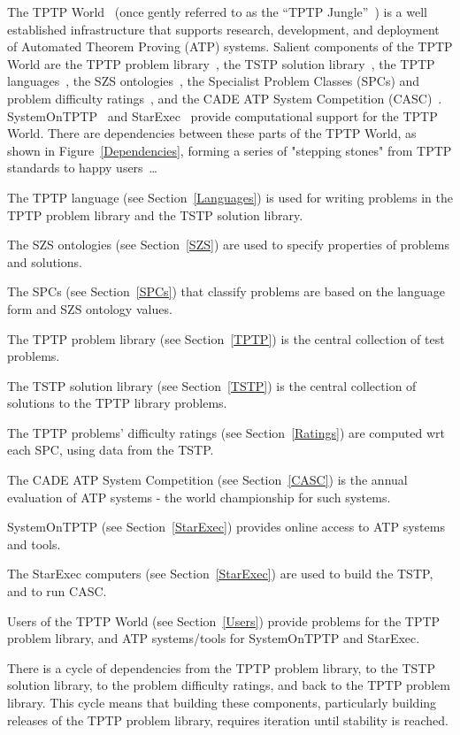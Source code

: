 \documentclass{easychair}
\newenvironment{packed_itemize}{
\vspace*{-0.2em}
\begin{itemize}
\setlength{\partopsep}{0pt}
\setlength{\itemsep}{1pt}
\setlength{\parskip}{0pt}
\setlength{\parsep}{0pt}
}{\end{itemize}}
\begin{document}
The TPTP World~\cite{Sut10,Sut17} (once gently referred to as the ``TPTP Jungle''~\cite{BU13}) is 
a well established infrastructure that supports research, development, and deployment of 
Automated Theorem Proving (ATP) systems.
Salient components of the TPTP World are
the TPTP problem library~\cite{Sut09}, 
the TSTP solution library~\cite{Sut10}, 
the TPTP languages~\cite{SS+06}, 
the SZS ontologies~\cite{Sut08-KEAPPA},
the Specialist Problem Classes (SPCs) and problem difficulty ratings~\cite{SS01},
and the CADE ATP System Competition (CASC)~\cite{Sut16}.
SystemOnTPTP~\cite{Sut00-CADE-17} and StarExec~\cite{SST14} provide computational support for
the TPTP World.
There are dependencies between these parts of the TPTP World, as shown in 
Figure~\ref{Dependencies}, forming a series of "stepping stones" from TPTP standards to 
happy users~\ldots
\begin{packed_itemize}
\item The TPTP language (see Section~\ref{Languages}) is used for writing problems in the TPTP
      problem library and the TSTP solution library.
\item The SZS ontologies (see Section~\ref{SZS}) are used to specify properties of problems
      and solutions.
\item The SPCs (see Section~\ref{SPCs}) that classify problems are based on the language form 
      and SZS ontology values.
\item The TPTP problem library (see Section~\ref{TPTP}) is the central collection of test problems.
\item The TSTP solution library (see Section~\ref{TSTP}) is the central collection of solutions
      to the TPTP library problems.
\item The TPTP problems' difficulty ratings (see Section~\ref{Ratings}) are computed wrt each
      SPC, using data from the TSTP.
\item The CADE ATP System Competition (see Section~\ref{CASC}) is the annual evaluation of 
      ATP systems - the world championship for such systems.
\item SystemOnTPTP (see Section~\ref{StarExec}) provides online access to ATP systems and tools.
\item The StarExec computers (see Section~\ref{StarExec}) are used to build the TSTP, and to run
      CASC.
\item Users of the TPTP World (see Section~\ref{Users}) provide problems for the TPTP problem
      library, and ATP systems/tools for SystemOnTPTP and StarExec.
\end{packed_itemize}
There is a cycle of dependencies from the TPTP problem library, to the TSTP solution 
library, to the problem difficulty ratings, and back to the TPTP problem library.
This cycle means that building these components, particularly building releases of the TPTP 
problem library, requires iteration until stability is reached.
\end{document}
